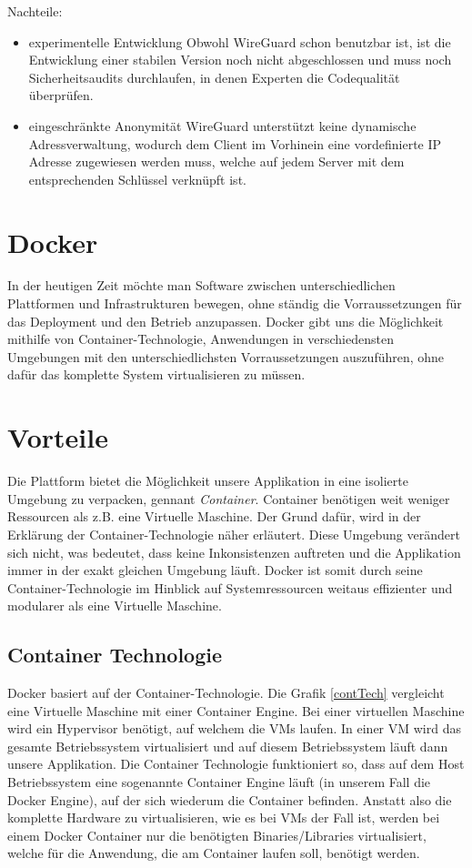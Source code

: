 Nachteile:
\begin{itemize}
    \item experimentelle Entwicklung \newline
    Obwohl WireGuard schon benutzbar ist, ist die Entwicklung einer stabilen Version noch nicht abgeschlossen und muss noch Sicherheitsaudits durchlaufen, in denen Experten die Codequalität überprüfen.
    \item eingeschränkte Anonymität \newline
    WireGuard unterstützt keine dynamische Adressverwaltung, wodurch dem Client im Vorhinein eine vordefinierte IP Adresse zugewiesen werden muss, welche auf jedem Server mit dem entsprechenden Schlüssel verknüpft ist.
\end{itemize}
\newpage
\section{Docker}
In der heutigen Zeit möchte man Software zwischen unterschiedlichen Plattformen und
Infrastrukturen bewegen, ohne ständig die Vorraussetzungen für das Deployment und den Betrieb
anzupassen.\newline
Docker gibt uns die Möglichkeit mithilfe von Container-Technologie, Anwendungen in
verschiedensten Umgebungen mit den unterschiedlichsten Vorraussetzungen auszuführen, ohne
dafür das komplette System virtualisieren zu müssen.
\section{Vorteile}
Die Plattform bietet die Möglichkeit unsere Applikation in eine isolierte Umgebung zu verpacken,
gennant \textit{Container}. Container benötigen weit weniger Ressourcen als z.B. eine Virtuelle
Maschine. Der Grund dafür, wird in der Erklärung der Container-Technologie näher erläutert.
Diese Umgebung verändert sich nicht, was bedeutet, dass keine Inkonsistenzen auftreten und die
Applikation immer in der exakt gleichen Umgebung läuft.
Docker ist somit durch seine Container-Technologie im Hinblick auf Systemressourcen weitaus
effizienter und modularer als eine Virtuelle Maschine.
\subsection{Container Technologie}
Docker basiert auf der Container-Technologie. Die Grafik \ref{contTech} vergleicht eine Virtuelle Maschine mit
einer Container Engine. Bei einer virtuellen Maschine wird ein Hypervisor benötigt, auf welchem die VMs laufen. In einer VM wird das gesamte Betriebssystem virtualisiert und auf diesem Betriebssystem läuft dann
unsere Applikation. Die Container Technologie funktioniert so, dass auf dem Host Betriebssystem eine sogenannte
Container Engine läuft (in unserem Fall die Docker Engine), auf der sich wiederum die Container
befinden. Anstatt also die komplette Hardware zu virtualisieren, wie es bei VMs der Fall ist, werden bei
einem Docker Container nur die benötigten Binaries/Libraries virtualisiert, welche für die
Anwendung, die am Container laufen soll, benötigt werden.

